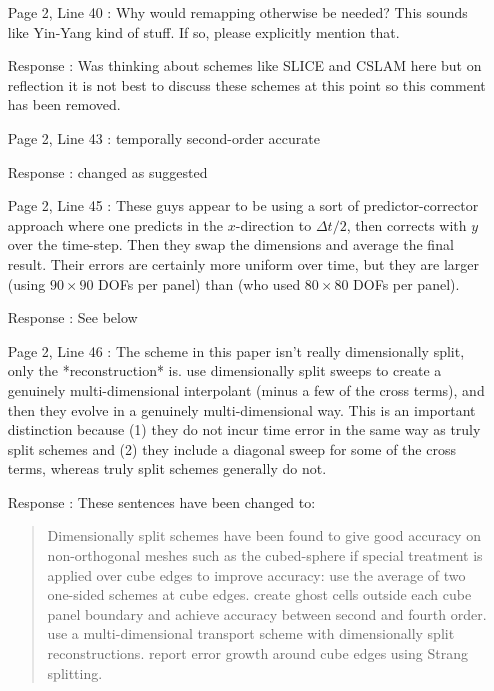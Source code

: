 \documentclass[12pt]{article}
\begin{document}
\begin{enumerate}
\item [Page 2, Line 40]: Why would remapping otherwise be needed? This sounds like Yin-Yang kind of stuff. If so, please explicitly mention that.

\item [Response]: Was thinking about schemes like SLICE and CSLAM here but on reflection it is not best to discuss these schemes at this point so this comment has been removed. 

\item [Page 2, Line 43]: temporally second-order accurate

\item [Response]: changed as suggested

\item [Page 2, Line 45]: These guys \cite[]{PL07} appear to be using a sort of predictor-corrector approach where one predicts in the $x$-direction to $\Delta t/2$, then corrects with $y$ over the time-step. Then they swap the dimensions and average the final result. Their errors are certainly more uniform over time, but they are larger (using $90\times 90$ DOFs per panel) than \cite{GNQ14} (who used $80\times 80$ DOFs per panel).

\item [Response]: See below

\item [Page 2, Line 46]: The scheme \cite[]{KNK15} in this paper isn't really dimensionally split, only the *reconstruction* is. \cite{KNK15} use dimensionally split sweeps to create a genuinely multi-dimensional interpolant (minus a few of the cross terms), and then they evolve in a genuinely multi-dimensional way. This is an important distinction because (1) they do not incur time error in the same way as truly split schemes and (2) they include a diagonal sweep for some of the cross terms, whereas truly split schemes generally do not.

\item [Response]: These sentences have been changed to:
\begin{quote}
Dimensionally split schemes have been found to give good accuracy on non-orthogonal meshes such as the cubed-sphere if special treatment is applied over cube edges to improve accuracy: \cite{PL07} use the average of two one-sided schemes at cube edges. \cite{KNK15} create ghost cells outside each cube panel boundary and achieve accuracy between second and fourth order. \cite{KNK15} use a multi-dimensional transport scheme with dimensionally split reconstructions. \cite[eg]{GNQ14} report error growth around cube edges using Strang splitting. 
\end{quote}


\end{enumerate}
\end{document}
